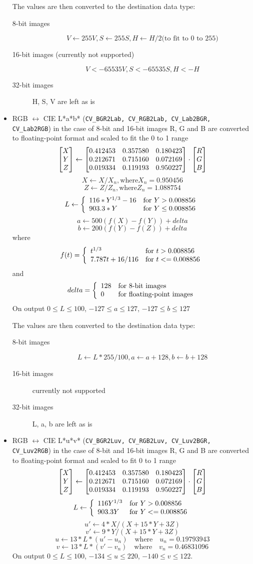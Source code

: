 \begin{itemize}
The values are then converted to the destination data type:
\begin{description}
\item[8-bit images]
\[ V \leftarrow 255 V, S \leftarrow 255 S, H \leftarrow H/2 \text{(to fit to 0 to 255)} \]
\item[16-bit images (currently not supported)]
\[ V <- 65535 V, S <- 65535 S, H <- H \]
\item[32-bit images]
H, S, V are left as is
\end{description}

 \item RGB $\leftrightarrow$ CIE L*a*b* (\texttt{CV\_BGR2Lab, CV\_RGB2Lab, CV\_Lab2BGR, CV\_Lab2RGB})
  in the case of 8-bit and 16-bit images
  R, G and B are converted to floating-point format and scaled to fit the 0 to 1 range
\[ \begin{bmatrix} X\\ Y\\ Z \end{bmatrix} \leftarrow \begin{bmatrix} 0.412453 & 0.357580 & 0.180423\\ 0.212671 & 0.715160 & 0.072169\\ 0.019334 & 0.119193 & 0.950227 \end{bmatrix}
\cdot
\begin{bmatrix} R\\ G\\ B \end{bmatrix} \]
\[ X \leftarrow X/X_n, \text{where} X_n = 0.950456 \]
\[ Z \leftarrow Z/Z_n, \text{where} Z_n = 1.088754 \]
\[ L \leftarrow \left\{ \begin{array}{l l} 116*Y^{1/3}-16 & \mbox{for $Y>0.008856$}\\ 903.3*Y & \mbox{for $Y \le 0.008856$}\\ \end{array} \right. \]
\[ a \leftarrow 500 (f(X)-f(Y)) + delta \]
\[ b \leftarrow 200 (f(Y)-f(Z)) + delta \]
where
\[f(t)=\left\{ \begin{array}{l l} t^{1/3} & \mbox{for $t>0.008856$}\\ 7.787 t+16/116 & \mbox{for $t<=0.008856$}\\ \end{array} \right. \]
and
\[ delta = \left\{ \begin{array}{l l} 128 & \mbox{for 8-bit images}\\ 0 & \mbox{for floating-point images}\\ \end{array} \right. \]
On output $0 \leq L \leq 100$, $-127 \leq a \leq 127$, $-127 \leq b \leq 127$

The values are then converted to the destination data type:
\begin{description}
\item[8-bit images]
\[L \leftarrow L*255/100, a \leftarrow a + 128, b \leftarrow b + 128\]
\item[16-bit images] currently not supported
\item[32-bit images]
L, a, b are left as is
\end{description}

 \item RGB $\leftrightarrow$ CIE L*u*v* (\texttt{CV\_BGR2Luv, CV\_RGB2Luv, CV\_Luv2BGR, CV\_Luv2RGB})
  in the case of 8-bit and 16-bit images
  R, G and B are converted to floating-point format and scaled to fit 0 to 1 range
  \[ \begin{bmatrix} X\\ Y\\ Z \end{bmatrix} \leftarrow \begin{bmatrix} 0.412453 & 0.357580 & 0.180423\\ 0.212671 & 0.715160 & 0.072169\\ 0.019334 & 0.119193 & 0.950227 \end{bmatrix}
\cdot
\begin{bmatrix} R\\ G\\ B \end{bmatrix} \]
\[ L \leftarrow \left\{ \begin{array}{l l} 116 Y^{1/3} & \mbox{for $Y>0.008856$}\\ 903.3 Y & \mbox{for $Y<=0.008856$}\\ \end{array} \right. \]
\[ u' \leftarrow 4*X/(X + 15*Y + 3 Z) \]
\[ v' \leftarrow 9*Y/(X + 15*Y + 3 Z) \]
\[ u \leftarrow 13*L*(u' - u_n) \quad \text{where} \quad u_n=0.19793943 \]
\[ v \leftarrow 13*L*(v' - v_n) \quad \text{where} \quad v_n=0.46831096 \]
On output $0 \leq L \leq 100$, $-134 \leq u \leq 220$, $-140 \leq v \leq 122$.


\end{itemize}
